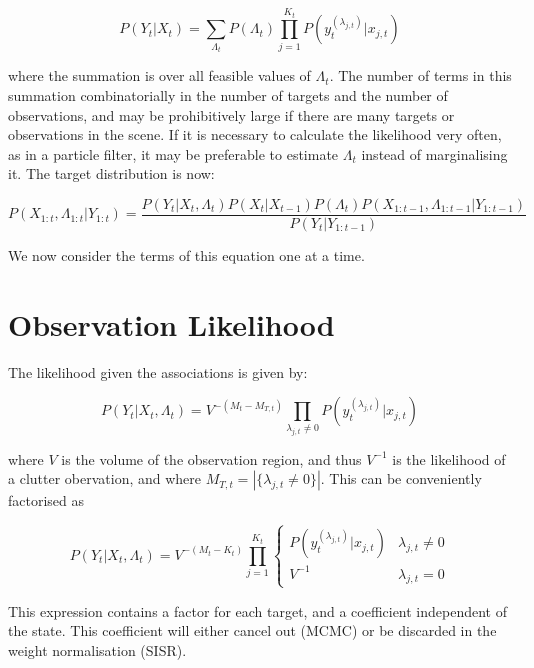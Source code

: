 \begin{equation}
P(Y_t|X_t) = \sum_{\Lambda_t} P(\Lambda_t) \prod_{j=1}^{K_t} P(y_t^{(\lambda_{j,t})}|x_{j,t})
\label{eq:MarginaliseAssociations}
\end{equation}

where the summation is over all feasible values of $\Lambda_t$. The number of terms in this summation combinatorially in the number of targets and the number of observations, and may be prohibitively large if there are many targets or observations in the scene. If it is necessary to calculate the likelihood very often, as in a particle filter, it may be preferable to estimate $\Lambda_t$ instead of marginalising it. The target distribution is now:

\begin{equation}
P(X_{1:t}, \Lambda_{1:t}|Y_{1:t}) = \frac{P(Y_t|X_t, \Lambda_t) P(X_t|X_{t-1}) P(\Lambda_t) P(X_{1:t-1}, \Lambda_{1:t-1}|Y_{1:t-1})}{P(Y_t|Y_{1:t-1})}
\label{eq:MTPosterior}
\end{equation}

We now consider the terms of this equation one at a time.

\section{Observation Likelihood}
The likelihood given the associations is given by:

\begin{equation}
P(Y_t|X_t, \Lambda_t) = V^{-(M_t-M_{T,t})} \prod_{\lambda_{j,t} \ne 0} P(y_t^{(\lambda_{j,t})}|x_{j,t})
\label{eq:MTLikelihood}
\end{equation}

where $V$ is the volume of the observation region, and thus $V^{-1}$ is the likelihood of a clutter obervation, and where $M_{T,t} = \left| \{ \lambda_{j,t} \ne 0 \} \right|$. This can be conveniently factorised as

\begin{equation}
P(Y_t|X_t, \Lambda_t) = V^{-(M_t-K_t)} \prod_{j=1}^{K_t} \begin{cases} P(y_t^{(\lambda_{j,t})}|x_{j,t}) & \lambda_{j,t} \ne 0 \\ V^{-1} & \lambda_{j,t} = 0 \end{cases}
\label{eq:MTFactorisedLikelihood}
\end{equation}

This expression contains a factor for each target, and a coefficient independent of the state. This coefficient will either cancel out (MCMC) or be discarded in the weight normalisation (SISR).




